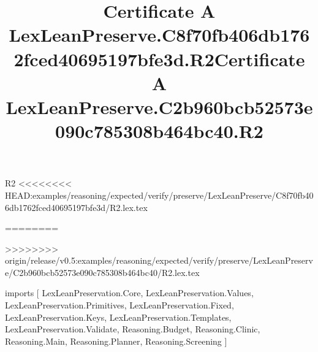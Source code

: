 \begin{lexlean}{R2}
<<<<<<<< HEAD:examples/reasoning/expected/verify/preserve/LexLeanPreserve/C8f70fb406db1762fced40695197bfe3d/R2.lex.tex
\title{Certificate A LexLeanPreserve.C8f70fb406db1762fced40695197bfe3d.R2}
========
\title{Certificate A LexLeanPreserve.C2b960bcb52573e090c785308b464bc40.R2}
>>>>>>>> origin/release/v0.5:examples/reasoning/expected/verify/preserve/LexLeanPreserve/C2b960bcb52573e090c785308b464bc40/R2.lex.tex
\begin{coremodule}
imports [
  LexLeanPreservation.Core,
  LexLeanPreservation.Values,
  LexLeanPreservation.Primitives,
  LexLeanPreservation.Fixed,
  LexLeanPreservation.Keys,
  LexLeanPreservation.Templates,
  LexLeanPreservation.Validate,
  Reasoning.Budget,
  Reasoning.Clinic,
  Reasoning.Main,
  Reasoning.Planner,
  Reasoning.Screening
]


\end{coremodule}
\end{lexlean}
